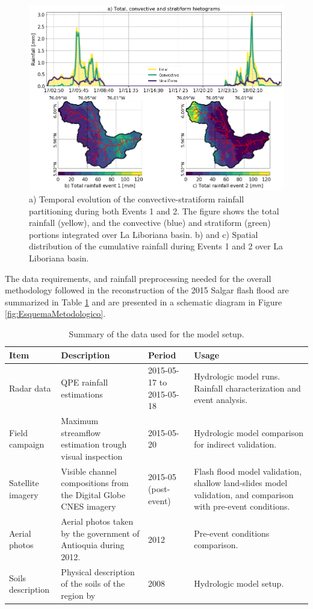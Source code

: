 \documentclass[hess, manuscript]{copernicus}
\begin{document}
\begin{figure}[t]
\centering
 \includegraphics[width=12cm]{Figures/Rainfall_separation.png}
 \caption{a) Temporal evolution of the convective-stratiform rainfall partitioning during both Events 1 and 2. The figure shows the total rainfall (yellow), and the convective (blue) and stratiform (green) portions integrated over La Liboriana basin. b) and c) Spatial distribution of the cumulative rainfall during Events 1 and 2 over La Liboriana basin.}
    \label{fig:separacionLluvia}
\end{figure}

The data requirements, and rainfall preprocessing needed for the overall methodology followed in the reconstruction of the 2015 Salgar flash flood are summarized in Table \ref{tab:data} and are   presented in a schematic diagram in Figure \ref{fig:EsquemaMetodologico}. \\


    \begin{table}[]
        \centering
        \begin{tabularx}{\textwidth}{p{2.5cm} p{4cm} p{2cm} p{4cm} }
    \hline 
    Item & Description & Period & Usage \\
    \hline
Radar data & QPE rainfall estimations & 2015-05-17 to 2015-05-18 & Hydrologic model runs. Rainfall characterization and event analysis. \\
Field campaign & Maximum streamflow estimation trough visual inspection & 2015-05-20 & Hydrologic model comparison for indirect validation. \\
Satellite imagery & Visible channel compositions from the Digital Globe CNES imagery & 2015-05 (post-event) & Flash flood model validation, shallow land-slides model validation, and comparison with pre-event conditions. \\
Aerial photos & Aerial photos taken by the government of Antioquia during 2012. & 2012 & Pre-event conditions comparison. \\
Soils description & Physical description of the soils of the region by \cite{Osorio2008} & 2008 & Hydrologic model setup. \\
\hline
\end{tabularx}
        \caption{Summary of the data used for the model setup.}
        \label{tab:data}
    \end{table}
\end{document}
